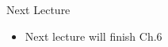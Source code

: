 \documentclass[aspectratio=1610]{beamer}
\begin{document}

%			
%			

\begin{frame}[wide]{Next Lecture}
	\begin{itemize}
		\item Next lecture will finish Ch.6
	\end{itemize}
\end{frame}
\end{document}
